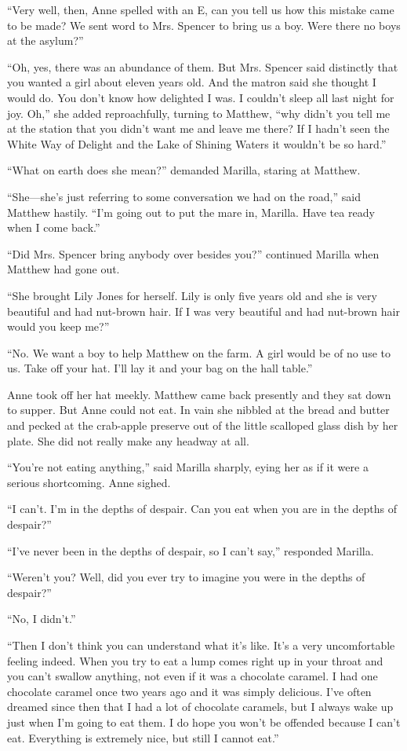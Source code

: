 \documentclass[a4paper]{article}
\begin{document}
{\large ``Very well, then, Anne spelled with an E, can you tell us how this mistake came to be made? We sent word to Mrs. Spencer to bring us a boy. Were there no boys at the asylum?''

``Oh, yes, there was an abundance of them. But Mrs. Spencer said distinctly that you wanted a girl about eleven years old. And the matron said she thought I would do. You don't know how delighted I was. I couldn't sleep all last night for joy. Oh,'' she added reproachfully, turning to Matthew, ``why didn't you tell me at the station that you didn't want me and leave me there? If I hadn't seen the White Way of Delight and the Lake of Shining Waters it wouldn't be so hard.''

``What on earth does she mean?'' demanded Marilla, staring at Matthew.

``She---she’s just referring to some conversation we had on the road,'' said Matthew hastily. ``I’m going out to put the mare in, Marilla. Have tea ready when I come back.''

``Did Mrs. Spencer bring anybody over besides you?'' continued Marilla when Matthew had gone out.}

{\Large ``She brought Lily Jones for herself. Lily is only five years old and she is very beautiful and had nut-brown hair. If I was very beautiful and had nut-brown hair would you keep me?''

``No. We want a boy to help Matthew on the farm. A girl would be of no use to us. Take off your hat. I’ll lay it and your bag on the hall table.''

Anne took off her hat meekly. Matthew came back presently and they sat down to supper. But Anne could not eat. In vain she nibbled at the bread and butter and pecked at the crab-apple preserve out of the little scalloped glass dish by her plate. She did not really make any headway at all.

``You’re not eating anything,'' said Marilla sharply, eying her as if it were a serious shortcoming. Anne sighed.

``I can’t. I’m in the depths of despair. Can you eat when you are in the depths of despair?''}

{\LARGE ``I’ve never been in the depths of despair, so I can’t say,'' responded Marilla.

``Weren’t you? Well, did you ever try to imagine you were in the depths of despair?''

``No, I didn’t.''

``Then I don’t think you can understand what it’s like. It’s a very uncomfortable feeling indeed. When you try to eat a lump comes right up in your throat and you can’t swallow anything, not even if it was a chocolate caramel. I had one chocolate caramel once two years ago and it was simply delicious. I’ve often dreamed since then that I had a lot of chocolate caramels, but I always wake up just when I’m going to eat them. I do hope you won’t be offended because I can’t eat. Everything is extremely nice, but still I cannot eat.''}
\end{document}
